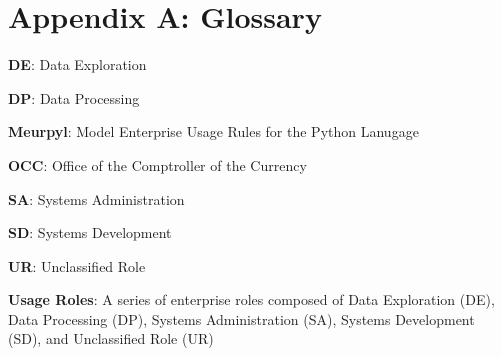 \newcommand{\definition}[2]{
	\textbf{#1}: #2
}

\section{Appendix A: Glossary}

\thispagestyle{section_start_style}

\vspace*{.3cm}

\setlength{\parskip}{.5em}

	\definition{DE}{Data Exploration}

	\definition{DP}{Data Processing}
	
	\definition{Meurpyl}{Model Enterprise Usage Rules for the Python Lanugage}

	\definition{OCC}{Office of the Comptroller of the Currency}

	\definition{SA}{Systems Administration}

	\definition{SD}{Systems Development}

	\definition{UR}{Unclassified Role}

	\definition{Usage Roles}{A series of enterprise roles composed of Data Exploration (DE), Data Processing (DP), Systems Administration (SA), Systems Development (SD), and Unclassified Role (UR)}

\setlength{\parskip}{1em}
